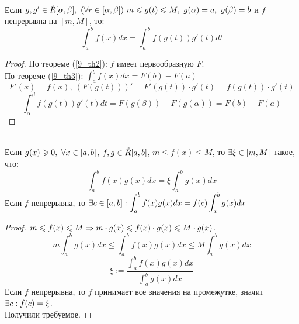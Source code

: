 \begin{theorem}\\
	Если $g,g'\in\mathring R[\alpha,\beta],\ (\forall r\in[\alpha,\beta])\ m\leqslant g(t)\leqslant M,\ g(\alpha)=a,\ g(\beta)=b$ и $f$ непрерывна на $[m,M]$, то:
	\[\int_a^bf(x)dx=\int_a^bf(g(t))g'(t)dt\]
\end{theorem}
\begin{proof}
	По теореме (\ref{9_th2}): $f$ имеет первообразную $F$.\\
	По теореме (\ref{9_th3}): $\displaystyle\int_a^bf(x)dx=F(b)-F(a)$
	\[F'(x)=f(x),\ (F(g(t)))'=F'(g(t))\cdot g'(t)=f(g(t))\cdot g'(t)\]
	\[\int_\alpha^\beta f(g(t))g'(t)dt=F(g(\beta))-F(g(\alpha))=F(b)-F(a)\]
\end{proof}
\begin{theorem}\\
	Если $g(x)\geqslant0,\ \forall x\in[a,b]$, $f,g\in\mathring R[a,b]$, $m\le f(x)\le M$, то $\exists\xi\in[m,M]$ такое, что:
	\[\int_a^bf(x)g(x)dx=\xi\int_a^bg(x)dx\]
	Если $f$ непрерывна, то $\displaystyle\exists c\in[a,b]:\int_a^bf(x)g(x)dx=f(c)\int_a^bg(x)dx$
\end{theorem}
\begin{proof}
	$m\leqslant f(x)\leqslant M\Rightarrow m\cdot g(x)\leqslant f(x)\cdot g(x)\leqslant M\cdot g(x)$.
	\[m\int_a^b g(x)dx\le\int_a^b f(x)g(x)dx\le M\int_a^bg(x)dx\]
	\[\xi:=\frac{\int_a^bf(x)g(x)dx}{\int_a^bg(x)dx}\]
	Если $f$ непрерывна, то $f$ принимает все значения на промежутке, значит $\exists c:f(c)=\xi$.\\
	Получили требуемое.
\end{proof}